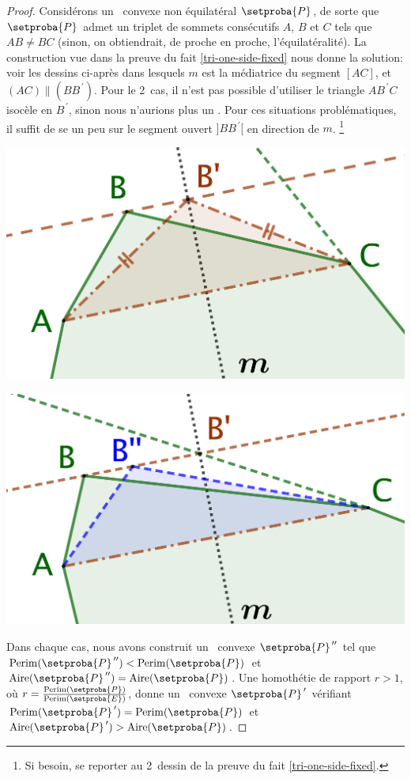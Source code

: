 \begin{proof}
	Considérons un \ngone\ convexe non équilatéral $\setproba{P}$,
	de sorte que $\setproba{P}$ admet un triplet de sommets consécutifs $A$, $B$ et $C$ tels que $AB \neq BC$
	(sinon, on obtiendrait, de proche en proche, l'équilatéralité).
	La construction vue dans la preuve du fait \ref{tri-one-side-fixed} nous donne la solution: voir les dessins ci-après dans lesquels
	$m$ est la médiatrice du segment $[AC]$,
	et
	$(AC) \parallel (BB^{\,\prime})$.
	Pour le 2\ieme\ cas, il n'est pas possible d'utiliser le triangle $AB^{\,\prime}C$ isocèle en $B^{\,\prime}$, sinon nous n'aurions plus un \ngone.
	Pour ces situations problématiques, il suffit de se  un peu sur le segment ouvert $]BB^{\,\prime}[$ en direction de $m$.%
	\footnote{
	    Si besoin, se reporter au 2\ieme\ dessin de la preuve du fait \ref{tri-one-side-fixed}.
	}
	\begin{multicols}{2}
		\centering

		\includegraphics[scale=.4]{content/polygon/sol-must-be/not-iso-IN.png}

		\includegraphics[scale=.4]{content/polygon/sol-must-be/not-iso-BORDER.png}
	\end{multicols}

	Dans chaque cas, nous avons construit un \ngone\ convexe $\dbleprimeit{\setproba{P}}$ tel que
	$\perim{\dbleprimeit{\setproba{P}}} < \perim{\setproba{P}}$
	et
	$\area{\dbleprimeit{\setproba{P}}} = \area{\setproba{P}}$.
	Une homothétie de rapport $r > 1$, où $r = \frac{ \perim{\setproba{P}} }{ \perim{\setproba{E}} }$, donne un \ngone\ convexe $\primeit{\setproba{P}}$ vérifiant
	$\perim{\primeit{\setproba{P}}} = \perim{\setproba{P}}$
	et
	$\area{\primeit{\setproba{P}}} > \area{\setproba{P}}$.
\end{proof}


